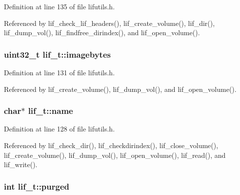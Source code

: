 Definition at line 135 of file lifutils.\+h.



Referenced by lif\+\_\+check\+\_\+lif\+\_\+headers(), lif\+\_\+create\+\_\+volume(), lif\+\_\+dir(), lif\+\_\+dump\+\_\+vol(), lif\+\_\+findfree\+\_\+dirindex(), and lif\+\_\+open\+\_\+volume().

\subsubsection[{\texorpdfstring{imagebytes}{imagebytes}}]{\setlength{\rightskip}{0pt plus 5cm}uint32\+\_\+t lif\+\_\+t\+::imagebytes}\hypertarget{structlif__t_afabd64e66adb03eef2249b6c627faac7}{}\label{structlif__t_afabd64e66adb03eef2249b6c627faac7}


Definition at line 131 of file lifutils.\+h.



Referenced by lif\+\_\+create\+\_\+volume(), lif\+\_\+dump\+\_\+vol(), and lif\+\_\+open\+\_\+volume().

\subsubsection[{\texorpdfstring{name}{name}}]{\setlength{\rightskip}{0pt plus 5cm}char$\ast$ lif\+\_\+t\+::name}\hypertarget{structlif__t_ae6b943f3c26005fc375169960e9049f7}{}\label{structlif__t_ae6b943f3c26005fc375169960e9049f7}


Definition at line 128 of file lifutils.\+h.



Referenced by lif\+\_\+check\+\_\+dir(), lif\+\_\+checkdirindex(), lif\+\_\+close\+\_\+volume(), lif\+\_\+create\+\_\+volume(), lif\+\_\+dump\+\_\+vol(), lif\+\_\+open\+\_\+volume(), lif\+\_\+read(), and lif\+\_\+write().

\subsubsection[{\texorpdfstring{purged}{purged}}]{\setlength{\rightskip}{0pt plus 5cm}int lif\+\_\+t\+::purged}\hypertarget{structlif__t_a1dfef3ca99d6ba9680bb9b6bf8fafc32}{}\label{structlif__t_a1dfef3ca99d6ba9680bb9b6bf8fafc32}


